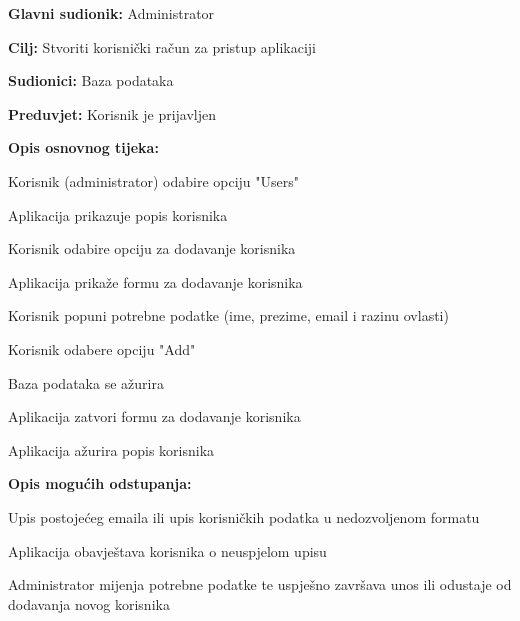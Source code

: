 					\noindent {}
					\begin{packed_item}

						\item \textbf{Glavni sudionik:} Administrator
						\item \textbf{Cilj:} Stvoriti korisnički račun za pristup aplikaciji
						\item \textbf{Sudionici:} Baza podataka
						\item \textbf{Preduvjet:} Korisnik je prijavljen
						\item \textbf{Opis osnovnog tijeka:}

						\item[] \begin{packed_enum}

							\item Korisnik (administrator) odabire opciju "Users"
							\item Aplikacija prikazuje popis korisnika
							\item Korisnik odabire opciju za dodavanje korisnika
							\item Aplikacija prikaže formu za dodavanje korisnika
							\item Korisnik popuni potrebne podatke (ime, prezime, email i razinu ovlasti)
							\item Korisnik odabere opciju "Add"
							\item Baza podataka se ažurira
							\item Aplikacija zatvori formu za dodavanje korisnika
							\item Aplikacija ažurira popis korisnika
						\end{packed_enum}

						\item \textbf{Opis mogućih odstupanja:}

						\item[] \begin{packed_item}

							\item[3.a] Upis postojećeg emaila ili upis korisničkih
							podatka u nedozvoljenom formatu
							\item[] \begin{packed_enum}

								\item Aplikacija obavještava korisnika o neuspjelom upisu
								\item Administrator mijenja potrebne podatke te uspješno završava unos ili
								odustaje od dodavanja novog korisnika

							\end{packed_enum}

						\end{packed_item}
					\end{packed_item}

